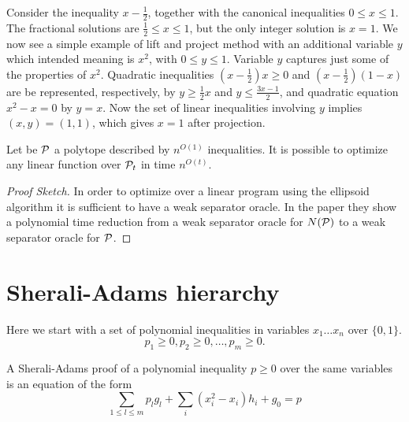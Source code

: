 \documentclass[a4paper,twoside,justified]{tufte-handout}
\begin{document}
\begin{example}
  Consider the inequality $ x-\frac{1}{2} $, together with the
  canonical inequalities $ 0\leq x \leq 1 $. The fractional solutions
  are $ \frac{1}{2} \leq x \leq 1 $, but the only integer solution is
  $ x=1 $. We now see a simple example of lift and project method with
  an additional variable $ y $ which intended meaning is $ x^{2} $,
  with $0\leq y \leq 1$. Variable $ y $ captures just some of the
  properties of $ x^{2} $. Quadratic inequalities $ (x-\frac{1}{2})x
  \geq 0 $ and $ (x-\frac{1}{2})(1-x) $ are be represented,
  respectively, by $ y \geq \frac{1}{2}x $ and $ y \leq \frac{3x-1}{2}
  $, and quadratic equation $ x^{2}-x=0 $ by $ y=x $.
  Now the set of linear inequalities involving $ y$ implies
  $(x,y)=(1,1)$, which gives $ x=1 $ after projection.
  
\end{example}

\begin{theorem}\cite{lovasz1991cones}
  Let be $\mathcal{P}$ a polytope described by $ n^{O(1)} $
  inequalities. It is possible to optimize any linear function over $
  \mathcal{P}_{t} $ in time $ n^{O(t)} $.
\end{theorem}
\begin{proof}[Proof Sketch]
  In order to optimize over a linear program using the ellipsoid
  algorithm it is sufficient to have a weak separator oracle. In the
  paper they show a polynomial time reduction from a weak separator
  oracle for $ N(\mathcal{P}) $ to a weak separator oracle for $\mathcal{P}$.
\end{proof}

\section{Sherali-Adams hierarchy}

Here we start with a set of polynomial inequalities in variables $
x_{1}\ldots x_{n} $ over $ \{0,1\} $.
\begin{equation}
  p_{1}\geq 0 , p_{2}\geq 0, \ldots , p_{m} \geq 0. 
\end{equation}

A Sherali-Adams proof of a polynomial inequality $p\geq 0$ over the
same variables is an equation of the form
\begin{equation}
 \label{eq:sa_inference}
 \sum_{1\leq l\leq m} p_{l} g_{l} + \sum_{i} (x^{2}_{i} -x_{i}) h_{i}
 + g_{0}= p
\end{equation}
\end{document}
